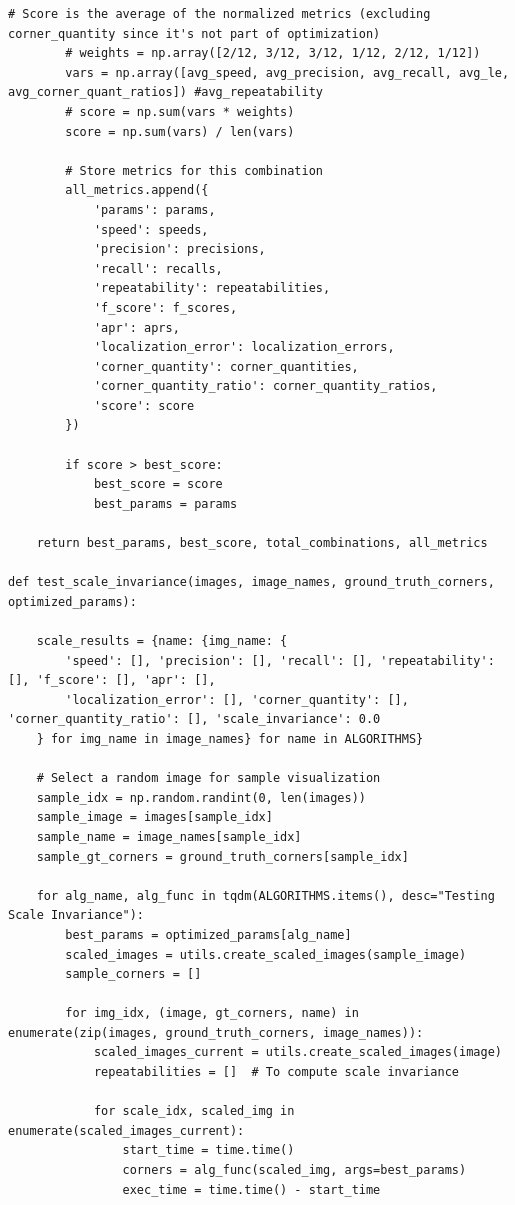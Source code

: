 \documentclass[journal]{IEEEtran}
\begin{document}
\begin{lstlisting}[style=python, caption={Driver Script for Project}, label={lst:driver}]
        # Score is the average of the normalized metrics (excluding corner_quantity since it's not part of optimization)
        # weights = np.array([2/12, 3/12, 3/12, 1/12, 2/12, 1/12])
        vars = np.array([avg_speed, avg_precision, avg_recall, avg_le, avg_corner_quant_ratios]) #avg_repeatability
        # score = np.sum(vars * weights)
        score = np.sum(vars) / len(vars)
        
        # Store metrics for this combination
        all_metrics.append({
            'params': params,
            'speed': speeds,
            'precision': precisions,
            'recall': recalls,
            'repeatability': repeatabilities,
            'f_score': f_scores,
            'apr': aprs,
            'localization_error': localization_errors,
            'corner_quantity': corner_quantities,
            'corner_quantity_ratio': corner_quantity_ratios,
            'score': score
        })
        
        if score > best_score:
            best_score = score
            best_params = params
    
    return best_params, best_score, total_combinations, all_metrics

def test_scale_invariance(images, image_names, ground_truth_corners, optimized_params):

    scale_results = {name: {img_name: {
        'speed': [], 'precision': [], 'recall': [], 'repeatability': [], 'f_score': [], 'apr': [],
        'localization_error': [], 'corner_quantity': [], 'corner_quantity_ratio': [], 'scale_invariance': 0.0
    } for img_name in image_names} for name in ALGORITHMS}
        
    # Select a random image for sample visualization
    sample_idx = np.random.randint(0, len(images))
    sample_image = images[sample_idx]
    sample_name = image_names[sample_idx]
    sample_gt_corners = ground_truth_corners[sample_idx]
    
    for alg_name, alg_func in tqdm(ALGORITHMS.items(), desc="Testing Scale Invariance"):
        best_params = optimized_params[alg_name]
        scaled_images = utils.create_scaled_images(sample_image)
        sample_corners = []
        
        for img_idx, (image, gt_corners, name) in enumerate(zip(images, ground_truth_corners, image_names)):
            scaled_images_current = utils.create_scaled_images(image)
            repeatabilities = []  # To compute scale invariance
            
            for scale_idx, scaled_img in enumerate(scaled_images_current):
                start_time = time.time()
                corners = alg_func(scaled_img, args=best_params)
                exec_time = time.time() - start_time
                

\end{lstlisting}
\end{document}
